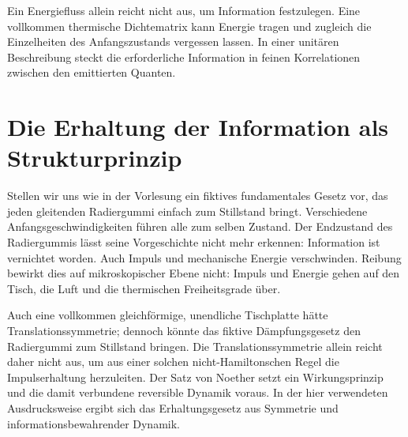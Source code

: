 Ein Energiefluss allein reicht nicht aus, um Information festzulegen. Eine vollkommen thermische Dichtematrix kann Energie tragen und zugleich die Einzelheiten des Anfangszustands vergessen lassen. In einer unitären Beschreibung steckt die erforderliche Information in feinen Korrelationen zwischen den emittierten Quanten.

\section{Die Erhaltung der Information als Strukturprinzip}

\begin{classroomqa}
\end{classroomqa}

Stellen wir uns wie in der Vorlesung ein fiktives fundamentales Gesetz vor, das jeden gleitenden Radiergummi einfach zum Stillstand bringt. Verschiedene Anfangsgeschwindigkeiten führen alle zum selben Zustand. Der Endzustand des Radiergummis lässt seine Vorgeschichte nicht mehr erkennen: Information ist vernichtet worden. Auch Impuls und mechanische Energie verschwinden. Reibung bewirkt dies auf mikroskopischer Ebene nicht: Impuls und Energie gehen auf den Tisch, die Luft und die thermischen Freiheitsgrade über.

Auch eine vollkommen gleichförmige, unendliche Tischplatte hätte Translationssymmetrie; dennoch könnte das fiktive Dämpfungsgesetz den Radiergummi zum Stillstand bringen. Die Translationssymmetrie allein reicht daher nicht aus, um aus einer solchen nicht-Hamiltonschen Regel die Impulserhaltung herzuleiten. Der Satz von Noether setzt ein Wirkungsprinzip und die damit verbundene reversible Dynamik voraus. In der hier verwendeten Ausdrucksweise ergibt sich das Erhaltungsgesetz aus Symmetrie und informationsbewahrender Dynamik.

\begin{classroomqa}
\end{classroomqa}

